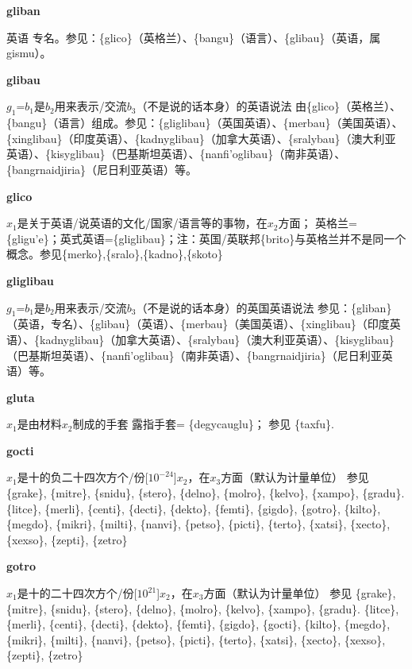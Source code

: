 \documentclass[notitlepage,twocolumn,a4paper,10pt]{book}
\begin{document}
{{\sffamily\bfseries gliban} 英语 \textemdash{} 专名。参见：\{glico\}（英格兰）、\{bangu\}（语言）、\{glibau\}（英语，属gismu）。

{\sffamily\bfseries glibau} $g_1$=$b_1$是$b_2$用来表示\slash{}交流$b_3$（不是说的话本身）的英语说法 \textemdash{} 由\{glico\}（英格兰）、\{bangu\}（语言）组成。参见：\{gliglibau\}（英国英语）、\{merbau\}（美国英语）、\{xinglibau\}（印度英语）、\{kadnyglibau\}（加拿大英语）、\{sralybau\}（澳大利亚英语）、\{kisyglibau\}（巴基斯坦英语）、\{nanfi'oglibau\}（南非英语）、\{bangrnaidjiria\}（尼日利亚英语）等。

{\sffamily\bfseries glico}  $x_1$是关于英语\slash{}说英语的文化\slash{}国家\slash{}语言等的事物，在$x_2$方面； \textemdash{} 英格兰=\{gligu'e\}；英式英语=\{gliglibau\}；注：英国\slash{}英联邦\{brito\}与英格兰并不是同一个概念。参见\{merko\},\{sralo\},\{kadno\},\{skoto\}

{\sffamily\bfseries gliglibau} $g_1$=$b_1$是$b_2$用来表示\slash{}交流$b_3$（不是说的话本身）的英国英语说法 \textemdash{} 参见：\{gliban\}（英语，专名）、\{glibau\}（英语）、\{merbau\}（美国英语）、\{xinglibau\}（印度英语）、\{kadnyglibau\}（加拿大英语）、\{sralybau\}（澳大利亚英语）、\{kisyglibau\}（巴基斯坦英语）、\{nanfi'oglibau\}（南非英语）、\{bangrnaidjiria\}（尼日利亚英语）等。

{\sffamily\bfseries gluta}\enspace {\ttfamily\bfseries[    glu]}  $x_1$是由材料$x_2$制成的手套 \textemdash{} 露指手套= \{degycauglu\}； 参见 \{taxfu\}.

{\sffamily\bfseries gocti}\enspace {\ttfamily\bfseries[goc]}  $x_1$是十的负二十四次方个\slash{}份[$10^{-24}$]$x_2$，在$x_3$方面（默认为计量单位） \textemdash{} 参见 \{grake\}, \{mitre\}, \{snidu\}, \{stero\}, \{delno\}, \{molro\}, \{kelvo\}, \{xampo\}, \{gradu\}. \{litce\}, \{merli\}, \{centi\}, \{decti\}, \{dekto\}, \{femti\}, \{gigdo\}, \{gotro\}, \{kilto\}, \{megdo\}, \{mikri\}, \{milti\}, \{nanvi\}, \{petso\}, \{picti\}, \{terto\}, \{xatsi\}, \{xecto\}, \{xexso\}, \{zepti\}, \{zetro\}

{\sffamily\bfseries gotro}\enspace {\ttfamily\bfseries[got]}  $x_1$是十的二十四次方个\slash{}份[$10^{21}$]$x_2$，在$x_3$方面（默认为计量单位） \textemdash{} 参见 \{grake\}, \{mitre\}, \{snidu\}, \{stero\}, \{delno\}, \{molro\}, \{kelvo\}, \{xampo\}, \{gradu\}. \{litce\}, \{merli\}, \{centi\}, \{decti\}, \{dekto\}, \{femti\}, \{gigdo\}, \{gocti\}, \{kilto\}, \{megdo\}, \{mikri\}, \{milti\}, \{nanvi\}, \{petso\}, \{picti\}, \{terto\}, \{xatsi\}, \{xecto\}, \{xexso\}, \{zepti\}, \{zetro\}

}
\end{document}
